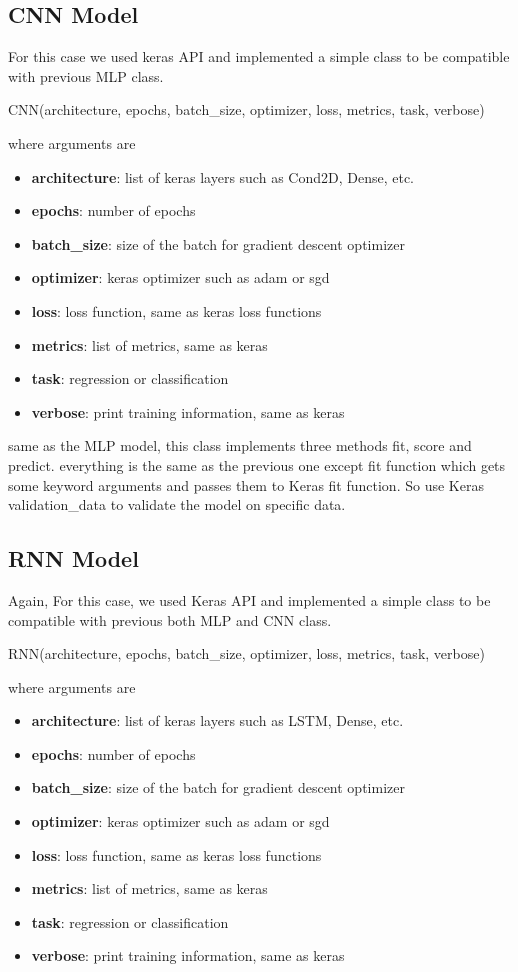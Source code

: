 \documentclass[10pt]{SelfArx} %
\begin{document}
	
	\subsection{CNN Model}
	For this case we used keras API and implemented a simple class to be compatible with previous MLP class.
	\begin{python}
CNN(architecture, epochs,
batch_size, optimizer, loss,
metrics, task, verbose)
	\end{python}
	where arguments are
	\begin{itemize}
		\item 	\textbf{architecture}: list of keras layers such as Cond2D, Dense, etc.
		\item  \textbf{epochs}: number of epochs
		\item  \textbf{batch\_size}: size of the batch for gradient descent optimizer
		\item  \textbf{optimizer}: keras optimizer such as adam or sgd
		\item  \textbf{loss}: loss function, same as keras loss functions
		\item \textbf{metrics}: list of metrics, same as keras
		\item  \textbf{task}: regression or classification
		\item  \textbf{verbose}: print training information, same as keras
	\end{itemize}
	
	same as the MLP model, this class implements three methods fit, score and predict. everything is the same as the previous one except fit function which gets some keyword arguments and passes them to Keras fit function. So use Keras validation\_data to validate the model on specific data.
	
	\subsection{RNN Model}
	Again, For this case, we used Keras API and implemented a simple class to be compatible with previous both MLP and CNN class.
	\begin{python}
RNN(architecture, epochs,
batch_size, optimizer, loss,
metrics, task, verbose)
	\end{python}
	where arguments are
	\begin{itemize}
		\item 	\textbf{architecture}: list of keras layers such as LSTM, Dense, etc.
		\item  \textbf{epochs}: number of epochs
		\item  \textbf{batch\_size}: size of the batch for gradient descent optimizer
		\item  \textbf{optimizer}: keras optimizer such as adam or sgd
		\item  \textbf{loss}: loss function, same as keras loss functions
		\item \textbf{metrics}: list of metrics, same as keras
		\item  \textbf{task}: regression or classification
		\item  \textbf{verbose}: print training information, same as keras
	\end{itemize}
	
\end{document}
